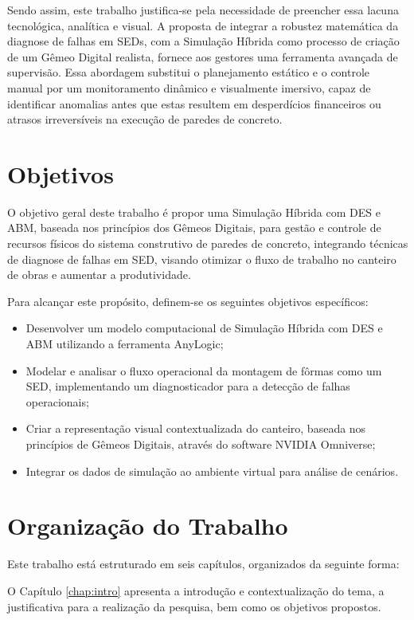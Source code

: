 Sendo assim, este trabalho justifica-se pela necessidade de preencher essa lacuna tecnológica, analítica e visual. A proposta de integrar a robustez matemática da diagnose de falhas em SEDs, com a Simulação Híbrida como processo de criação de um Gêmeo Digital realista, fornece aos gestores uma ferramenta avançada de supervisão. Essa abordagem substitui o planejamento estático e o controle manual por um monitoramento dinâmico e visualmente imersivo, capaz de identificar anomalias antes que estas resultem em desperdícios financeiros ou atrasos irreversíveis na execução de paredes de concreto. 


\section{Objetivos}
\label{sec:objetivos}
O objetivo geral deste trabalho é propor uma Simulação Híbrida com DES e ABM, baseada nos princípios dos Gêmeos Digitais, para gestão e controle de recursos físicos do sistema construtivo de paredes de concreto, integrando técnicas de diagnose de falhas em SED, visando otimizar o fluxo de trabalho no canteiro de obras e aumentar a produtividade.

Para alcançar este propósito, definem-se os seguintes objetivos específicos:

\begin{itemize}
	\item Desenvolver um modelo computacional de Simulação Híbrida com DES e ABM utilizando a ferramenta AnyLogic;
	\item Modelar e analisar o fluxo operacional da montagem de fôrmas como um SED, implementando um diagnosticador para a detecção de falhas operacionais;
	\item Criar a representação visual contextualizada do canteiro, baseada nos princípios de Gêmeos Digitais, através do software NVIDIA Omniverse;
	\item Integrar os dados de simulação ao ambiente virtual para análise de cenários.
\end{itemize}

\section{Organização do Trabalho}
\label{sec:organizacao}
Este trabalho está estruturado em seis capítulos, organizados da seguinte forma:

O Capítulo \ref{chap:intro} apresenta a introdução e contextualização do tema, a justificativa para a realização da pesquisa, bem como os objetivos propostos.

